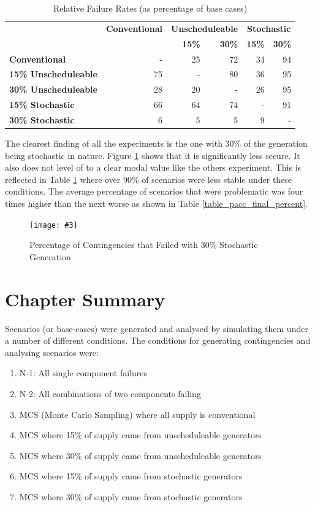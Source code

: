 \documentclass[a4paper,oneside,12pt]{report}
\newcommand{\image}[3] {
  \begin{figure}
    \begin{center}
      \texttt{[image: \#3]}
      \caption{#2}
      \label{#1}
    \end{center}
  \end{figure}
}
\begin{document}
\begin{table}[htbp]
\caption{Relative Failure Rates (as percentage of base cases)}
\begin{tabular}{l|r|r|r|r|r}
\bfseries & \bfseries Conventional & \multicolumn{2}{c|}{ \bfseries Unscheduleable} & \multicolumn{2}{c}{ \bfseries Stochastic} \\
\bfseries & \bfseries & \bfseries 15\% & \bfseries 30\% & \bfseries 15\% & \bfseries 30\% \\
\hline \hline
\bfseries Conventional        &  - & 25 & 72 & 34 & 94 \\
\bfseries 15\% Unscheduleable & 75 &  - & 80 & 36 & 95 \\
\bfseries 30\% Unscheduleable & 28 & 20 &  - & 26 & 95 \\
\bfseries 15\% Stochastic     & 66 & 64 & 74 &  - & 91 \\
\bfseries 30\% Stochastic     &  6 &  5 &  5 &  9 &  - \\
\hline
\end{tabular}
\label{table_relative_failure_percent}
\end{table}

The clearest finding of all the experiments is the one with 30\% of the generation being stochastic in nature. Figure \ref{pacc-wind30} shows that it is significantly less secure. It also does not level of to a clear modal value like the others experiment. This is reflected in Table \ref{table_relative_failure_percent} where over 90\% of scenarios were less stable under these conditions. The average percentage of scenarios that were problematic was four times higher than the next worse as shown in Table \ref{table_pacc_final_percent}.

\image{pacc-wind30}{Percentage of Contingencies that Failed with 30\% Stochastic Generation}{pacc-wind30.png}

\section{Chapter Summary}

Scenarios (or base-cases) were generated and analysed by simulating them under a number of different conditions. The conditions for generating contingencies and analysing scenarios were:

\begin{enumerate}
\item N-1: All single component failures
\item N-2: All combinations of two components failing
\item MCS (Monte Carlo Sampling) where all supply is conventional
\item MCS where 15\% of supply came from unscheduleable generators
\item MCS where 30\% of supply came from unscheduleable generators
\item MCS where 15\% of supply came from stochastic generators
\item MCS where 30\% of supply came from stochastic generators
\end{enumerate}
\end{document}
